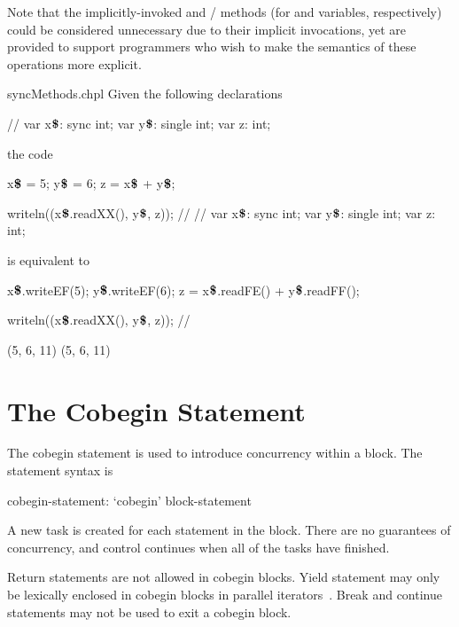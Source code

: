 Note that the implicitly-invoked 
and / methods (for 
and  variables, respectively) could be considered
unnecessary due to their implicit invocations, yet are provided to
support programmers who wish to make the semantics of these operations
more explicit.


\begin{chapelexample}{syncMethods.chpl}
Given the following declarations
\begin{chapel}
{ // }
var x$\mbox{{\bf \$}}$: sync int;
var y$\mbox{{\bf \$}}$: single int;
var z: int;
\end{chapel}
the code
\begin{chapel}
x$\mbox{{\bf \$}}$ = 5;
y$\mbox{{\bf \$}}$ = 6;
z = x$\mbox{{\bf \$}}$ + y$\mbox{{\bf \$}}$;
\end{chapel}
\begin{chapelnoprint}
writeln((x$\mbox{{\bf \$}}$.readXX(), y$\mbox{{\bf \$}}$, z));
// {
}
{ // }
var x$\mbox{{\bf \$}}$: sync int;
var y$\mbox{{\bf \$}}$: single int;
var z: int;
\end{chapelnoprint}
is equivalent to
\begin{chapel}
x$\mbox{{\bf \$}}$.writeEF(5);
y$\mbox{{\bf \$}}$.writeEF(6);
z = x$\mbox{{\bf \$}}$.readFE() + y$\mbox{{\bf \$}}$.readFF();
\end{chapel}
\begin{chapelpost}
writeln((x$\mbox{{\bf \$}}$.readXX(), y$\mbox{{\bf \$}}$, z));
// {
}
\end{chapelpost}
\begin{chapeloutput}
(5, 6, 11)
(5, 6, 11)
\end{chapeloutput}
\end{chapelexample}

\section{The Cobegin Statement}
\label{Cobegin}

The cobegin statement is used to introduce concurrency within a
block.  The  statement syntax is
\begin{syntax}
cobegin-statement:
  `cobegin' block-statement
\end{syntax}
A new task is created for each statement in the block.  There are no
guarantees of concurrency, and control continues when all of the tasks
have finished.

Return statements are not allowed in cobegin blocks.  Yield statement
may only be lexically enclosed in cobegin blocks in parallel
iterators~.  Break and continue statements
may not be used to exit a cobegin block.


